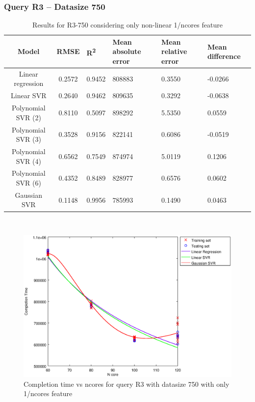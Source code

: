 \documentclass[a4paper,11pt]{article}
\begin{document}
\newpage
\subsubsection{Query R3 -- Datasize 750}
\begin{table}[H]
	\centering
	\begin{adjustbox}{center}
		\begin{tabular}{c | c M{1.2cm} M{2.5cm} M{2.5cm} M{1.8cm}}
			Model & RMSE & R\textsuperscript{2} & Mean absolute error & Mean relative error & Mean difference \tabularnewline
			\hline
			Linear regression & 0.2572 & 0.9452 & 808883 & 0.3550 & -0.0266 \\
			Linear SVR & 0.2640 & 0.9462 & 809635 & 0.3292 & -0.0638 \\
			Polynomial SVR (2) & 0.8110 & 0.5097 & 898292 & 5.5350 & 0.0559 \\
			Polynomial SVR (3) & 0.3528 & 0.9156 & 822141 & 0.6086 & -0.0519 \\
			Polynomial SVR (4) & 0.6562 & 0.7549 & 874974 & 5.0119 & 0.1206 \\
			Polynomial SVR (6) & 0.4352 & 0.8489 & 828977 & 0.6576 & 0.0602 \\
			Gaussian SVR & 0.1148 & 0.9956 & 785993 & 0.1490 & 0.0463 \\
		\end{tabular}
	\end{adjustbox}
	\\
	\caption{Results for R3-750 considering only non-linear 1/ncores feature}
	\label{table_R3_prediction_all}
\end{table}

\begin {figure}[hbtp]
\centering
\includegraphics[width=\textwidth]{output/R3_750_ONLY_1_OVER_NCORES/plot_R3_750_bestmodels.eps}
\caption {Completion time vs ncores for query R3 with datasize 750 with only 1/ncores feature}
\end {figure}
\end{document}

